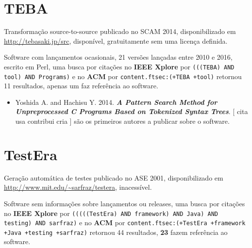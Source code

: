 \section{TEBA}

Transformação source-to-source
publicado no SCAM 2014,
disponibilizado em \url{http://tebasaki.jp/src},
disponível,
gratuitamente
sem uma licença definida.

Software com lançamentos ocasionais,
21 versões lançadas
entre 2010 e 2016,
escrito em Perl,
uma busca por citações no {\bf IEEE Xplore} por
\texttt{(((TEBA) AND tool) AND Programs)}
e no {\bf ACM} por
\texttt{content.ftsec:(+TEBA +tool)}
retornou
11 resultados,
apenas um faz referência ao software.

\begin{itemize}
\item Yoshida A. and Hachisu Y.
      2014.
        \textbf{\textit{ A Pattern Search Method for Unpreprocessed C Programs Based on Tokenized Syntax Trees}}.
      [
          cita
          usa
          contribui
          cria
      ]
são os primeiros autores a publicar sobre o software.
\end{itemize}
\section{TestEra}

Geração automática de testes
publicado no ASE 2001,
disponibilizado em \url{http://www.mit.edu/~sarfraz/testera},
inacessível.

Software sem informações sobre lançamentos ou releases,
uma busca por citações no {\bf IEEE Xplore} por
\texttt{(((((TestEra) AND framework) AND Java) AND testing) AND sarfraz)}
e no {\bf ACM} por
\texttt{content.ftsec:(+TestEra +framework +Java +testing +sarfraz)}
retornou
44 resultados,
{\bf 23} fazem referência ao software.

